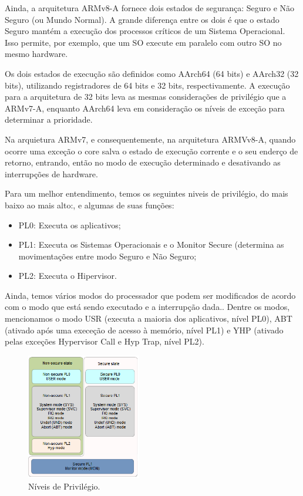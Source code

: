 \documentclass[12pt,a4paper,utf8]{ppgsi}
\begin{document}
        Ainda, a arquitetura ARMv8-A fornece dois estados de segurança: Seguro e Não Seguro (ou Mundo Normal). A grande diferença entre os dois é que o estado Seguro mantém a execução dos processos críticos de um Sistema Operacional. Isso permite, por exemplo, que um SO execute em paralelo com outro SO no mesmo hardware. 
        
        Os dois estados de execução são definidos como AArch64 (64 bits) e AArch32 (32 bits), utilizando registradores de 64 bits e 32 bits, respectivamente. A execução para a arquitetura de 32 bits leva as mesmas considerações de privilégio que a ARMv7-A, enquanto AArch64 leva em consideração os níveis de exceção para determinar a prioridade.
        
       Na arquietura ARMv7, e consequentemente, na arquitetura ARMVv8-A, quando ocorre uma exceção o core salva o estado de execução corrente e o seu enderço de retorno, entrando, então no modo de execução determinado e desativando as interrupções de hardware.
        
        Para um melhor entendimento, temos os seguintes niveis de privilégio, do mais baixo ao mais alto:, e algumas de suas funções:
        
        \begin{itemize}
            \item PL0: Executa os aplicativos;
            \item         PL1: Executa os Sistemas Operacionais e o Monitor Secure (determina as movimentações entre modo Seguro e Não Seguro;
            \item         PL2: Executa o Hipervisor.
        \end{itemize}

        
        Ainda, temos vários modos do processador que podem ser modificados de acordo com o modo que está sendo executado e a interrupção dada.. Dentre os modos, mencionamos o modo USR (executa a maioria dos aplicativos, nível PL0), ABT (ativado após uma execeção de acesso à memório, nível PL1) e YHP (ativado pelas exceções Hypervisor Call e Hyp Trap, nível PL2).
        
        \begin{figure}[H]
		\centering
		\includegraphics[width=5cm]{privilegios.eps}
		\caption{Níveis de Privilégio.}
		\label{Fig:taxonomia}
	    \end{figure}
\end{document}
